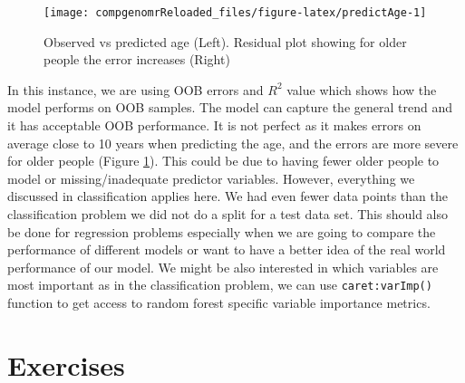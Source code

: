 \documentclass[12pt,]{krantz}
\newenvironment{Shaded}{\begin{snugshade}}{\end{snugshade}}
\newcommand{\CommentTok}[1]{\textcolor[rgb]{0.56,0.35,0.01}{\textit{#1}}}
\newcommand{\DataTypeTok}[1]{\textcolor[rgb]{0.13,0.29,0.53}{#1}}
\newcommand{\DecValTok}[1]{\textcolor[rgb]{0.00,0.00,0.81}{#1}}
\newcommand{\KeywordTok}[1]{\textcolor[rgb]{0.13,0.29,0.53}{\textbf{#1}}}
\newcommand{\NormalTok}[1]{#1}
\newcommand{\OperatorTok}[1]{\textcolor[rgb]{0.81,0.36,0.00}{\textbf{#1}}}
\newcommand{\StringTok}[1]{\textcolor[rgb]{0.31,0.60,0.02}{#1}}
\begin{document}
\begin{Shaded}
\end{Shaded}

\begin{figure}

{\centering \texttt{[image: compgenomrReloaded\_files/figure-latex/predictAge-1]} 

}

\caption{Observed vs predicted age (Left). Residual plot showing for older people the error increases (Right)}\label{fig:predictAge}
\end{figure}

In this instance, we are using OOB errors and \(R^2\) value which shows how the model performs on OOB samples. The model can capture the general trend and it has acceptable OOB performance. It is not perfect as it makes errors on average close to 10 years when predicting the age, and the errors are more severe for older people (Figure \ref{fig:predictAge}). This could be due to having fewer older people to model or missing/inadequate predictor variables. However, everything we discussed in classification applies here. We had even fewer data points than the classification problem we did not do a split for a test data set. This should also be done for regression problems especially when we are going to compare the performance of different models or want to have a better idea of the real world performance of our model. We might be also interested in which variables are most important as in the classification problem, we can use \texttt{caret:varImp()} function to get access to random forest specific variable importance metrics.

\hypertarget{exercises-3}{%
\section{Exercises}\label{exercises-3}}
\end{document}
